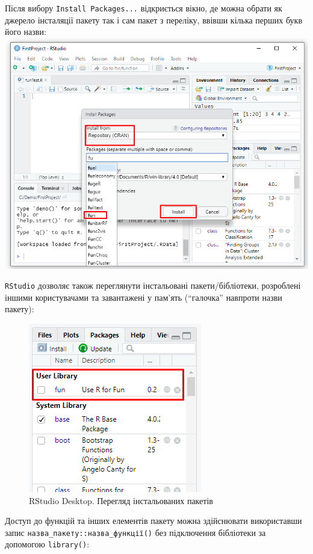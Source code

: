 \documentclass[
]{book}
\begin{document}
Після вибору \texttt{Install\ Packages...} відкриється вікно, де можна обрати як джерело інсталяції пакету так і сам пакет з переліку, ввівши кілька перших букв його назви:
\includegraphics{images/chapter1/packages_2.png}

\texttt{RStudio} дозволяє також переглянути інстальовані пакети/бібліотеки, розроблені іншими користувачами та завантажені у пам'ять (``галочка'' навпроти назви пакету):

\begin{figure}
\centering
\includegraphics{images/chapter1/packages_3.png}
\caption{\label{fig:unnamed-chunk-33}RStudio Desktop. Перегляд інстальованих пакетів}
\end{figure}

Доступ до функцій та інших елементів пакету можна здійснювати використавши запис \texttt{назва\_пакету::назва\_функції()} без підключення бібліотеки за допомогою \texttt{library()}:
\end{document}
